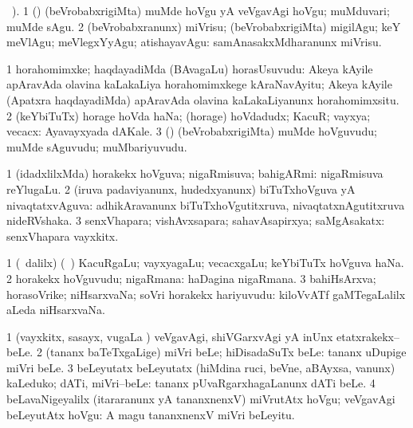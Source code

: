 \bentry
{}
\gl{\sakirx}
 \BUkaq\ ).\bmng
\bnum
\num{1} (\pArxparx) (beVrobabxrigiMta) muMde hoVgu yA veVgavAgi hoVgu; muMduvari; muMde sAgu. 
\num{2} (beVrobabxranunx) miVrisu; (beVrobabxrigiMta) migilAgu; keY meVlAgu; meVlegxYyAgu; atishayavAgu:  samAnasakxMdharanunx miVrisu. 
\enum
\emng
\eentry

\bentry
{}
\gl{\nA}
\bmng
\bnum
\num{1} horahomimxke; haqdayadiMda (BAvagaLu) horasUsuvudu:  Akeya kAyile apAravAda olavina kaLakaLiya horahomimxkege kAraNavAyitu; Akeya kAyile (Apatxra haqdayadiMda) apAravAda olavina kaLakaLiyanunx horahomimxsitu. 
\num{2} (keYbiTuTx) horage hoVda haNa; (horage) hoVdadudx; KacuR; vayxya; vecacx:  Ayavayxyada dAKale. 
\num{3} (\pArxparx) (beVrobabxrigiMta) muMde hoVguvudu; muMde sAguvudu; muMbariyuvudu. 
\enum
\emng
\eentry

\bentry
{}
\gl{\gu}
\bmng
\bnum
\num{1} (idadxlilxMda) horakekx hoVguva; nigaRmisuva; bahigARmi:  nigaRmisuva reYlugaLu. 
\num{2} (iruva padaviyanunx, hudedxyanunx) biTuTxhoVguva yA nivaqtatxvAguva:  adhikAravanunx biTuTxhoVgutitxruva, nivaqtatxnAgutitxruva nideRVshaka. 
\num{3} senxVhapara; vishAvxsapara; sahavAsapirxya; saMgAsakatx:  senxVhapara vayxkitx. 
\enum
\emng
\eentry

\bentry
{}
\gl{\nA}
\bmng
\bnum
\num{1} (\sA\ \bava dalilx) (\kanmu\ \birx) KacuRgaLu; vayxyagaLu; vecacxgaLu; keYbiTuTx hoVguva haNa. 
\num{2} horakekx hoVguvudu; nigaRmana:  haDagina nigaRmana. 
\num{3} bahiHsArxva; horasoVrike; niHsarxvaNa; soVri horakekx hariyuvudu:  kiloVvATf gaMTegaLalilx aLeda niHsarxvaNa. 
\enum
\emng
\eentry

\bentry
{}
\gl{\sakirx}
\bmng
\bnum
\num{1} (vayxkitx, sasayx, \mo vugaLa \vi) veVgavAgi, shiVGarxvAgi yA inUnx etatxrakekx--beLe. 
\num{2} (tananx baTeTxgaLige) miVri beLe; hiDisadaSuTx beLe:  tananx uDupige miVri beLe. 
\num{3} beLeyutatx beLeyutatx (hiMdina ruci, beVne, aBAyxsa, \mo vanunx) kaLeduko; dATi, miVri--beLe:  tananx pUvaRgarxhagaLanunx dATi beLe. 
\num{4} beLavaNigeyalilx (itararanunx yA tananxnenxV) miVrutAtx hoVgu; veVgavAgi beLeyutAtx hoVgu:  A magu tananxnenxV miVri beLeyitu. 
\enum
\emng

